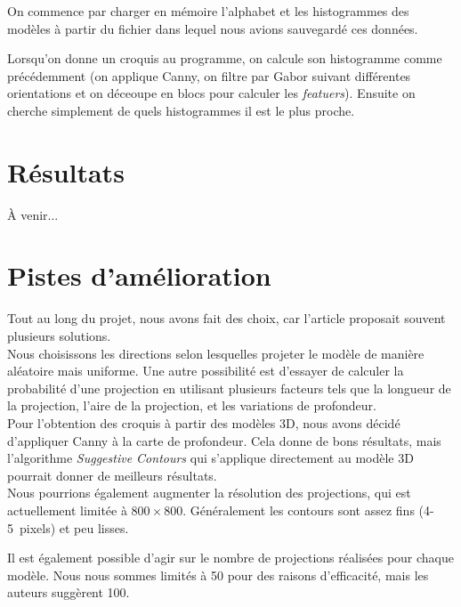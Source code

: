 \documentclass[12pt, a4paper, oneside]{article}
\begin{document}
On commence par charger en mémoire l'alphabet et les histogrammes des modèles à partir du fichier dans lequel nous avions sauvegardé ces données.

Lorsqu'on donne un croquis au programme, on calcule son histogramme comme précédemment (on applique Canny, on filtre par Gabor suivant différentes orientations et on déceoupe en blocs pour calculer les \emph{featuers}).
Ensuite on cherche simplement de quels histogrammes il est le plus proche.


\section{Résultats}

À venir...

\section{Pistes d'amélioration}

Tout au long du projet, nous avons fait des choix, car l'article proposait souvent plusieurs solutions.\\

Nous choisissons les directions selon lesquelles projeter le modèle de manière aléatoire mais uniforme.
Une autre possibilité est d'essayer de calculer la probabilité d'une projection en utilisant plusieurs facteurs tels que la longueur de la projection, l'aire de la projection, et les variations de profondeur.\\

Pour l'obtention des croquis à partir des modèles 3D, nous avons décidé d'appliquer Canny à la carte de profondeur.
Cela donne de bons résultats, mais l'algorithme \emph{Suggestive Contours} qui s'applique directement au modèle 3D pourrait donner de meilleurs résultats.\\

Nous pourrions également augmenter la résolution des projections, qui est actuellement limitée à $800 \times 800$.
Généralement les contours sont assez fins (4-5~pixels) et peu lisses.

Il est également possible d'agir sur le nombre de projections réalisées pour chaque modèle.
Nous nous sommes limités à 50 pour des raisons d'efficacité, mais les auteurs suggèrent 100.
\end{document}

